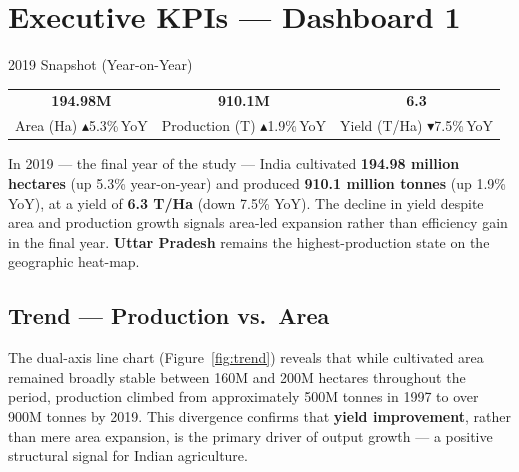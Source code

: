 \documentclass[10pt]{article}
\begin{document}
\section{Executive KPIs — Dashboard 1}

\begin{kpibox}{2019 Snapshot (Year-on-Year)}
  \begin{center}
    \begin{tabular}{ccc}
      \large\textcolor{kpiblue}{\textbf{194.98M}} &
      \large\textcolor{kpiblue}{\textbf{910.1M}} &
      \large\textcolor{kpiblue}{\textbf{6.3}} \\[2pt]
      \small Area (Ha) {\tiny\textcolor{successgreen}{$\blacktriangle$5.3\%\,YoY}} &
      \small Production (T) {\tiny\textcolor{successgreen}{$\blacktriangle$1.9\%\,YoY}} &
      \small Yield (T/Ha) {\tiny\textcolor{alertred}{$\blacktriangledown$7.5\%\,YoY}}
    \end{tabular}
  \end{center}
\end{kpibox}

\vspace{4pt}

In 2019 — the final year of the study — India cultivated \textbf{194.98 million
hectares} (up 5.3\% year-on-year) and produced \textbf{910.1 million tonnes}
(up 1.9\% YoY), at a yield of \textbf{6.3 T/Ha} (down 7.5\% YoY). The
decline in yield despite area and production growth signals area-led expansion
rather than efficiency gain in the final year. \textbf{Uttar Pradesh} remains
the highest-production state on the geographic heat-map.

\subsection{Trend — Production vs.\ Area}
The dual-axis line chart (Figure~\ref{fig:trend}) reveals that while cultivated
area remained broadly stable between 160M and 200M hectares throughout the period,
production climbed from approximately 500M tonnes in 1997 to over 900M tonnes by
2019. This divergence confirms that \textbf{yield improvement}, rather than mere
area expansion, is the primary driver of output growth — a positive structural
signal for Indian agriculture.
\end{document}
